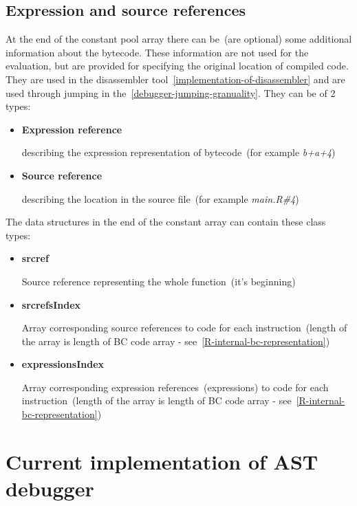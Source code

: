 \documentclass[thesis=M,english]{FITthesis}[2018/10/20]
\begin{document}
\subsection{Expression and source references}\label{Exprref-and-srcref}

At the end of the constant pool array there can be~(are optional) some additional information about the bytecode. These information are not used for the evaluation, but are provided for specifying the original location of compiled code. They are used in the disassembler tool~\ref{implementation-of-disassembler} and are used through jumping in the~\ref{debugger-jumping-granuality}. They can be of 2 types:

\begin{itemize}
	\item \textbf{Expression reference}

describing the expression representation of bytecode~(for example \textit{b+a+4})

	\item \textbf{Source reference}

describing the location in the source file~(for example \textit{main.R{\#}4})
\end{itemize}

The data structures in the end of the constant array can contain these class types:

\begin{itemize}
	\item \textbf{srcref}

Source reference representing the whole function~(it's beginning)

	\item \textbf{srcrefsIndex}

Array corresponding source references to code for each instruction~(length of the array is length of BC code array - see~\ref{R-internal-bc-representation})

	\item \textbf{expressionsIndex}

Array corresponding expression references~(expressions) to code for each instruction~(length of the array is length of BC code array - see~\ref{R-internal-bc-representation})

\end{itemize}

\section{Current implementation of AST debugger}\label{AST-debugger}
\end{document}
